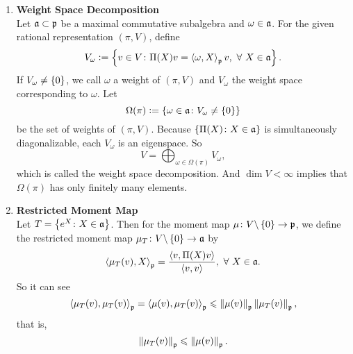 \documentclass[suri,pdfbookmark]{engsuribt} %
\begin{document}
  \begin{enumerate}[label = \arabic*.]
    \item \textbf{Weight Space Decomposition} \\
    Let $\mathfrak{a} \subset \mathfrak{p}$ be a maximal commutative subalgebra and $\omega \in \mathfrak{a}$. For the given rational representation $(\pi,V)$, define
    \begin{equation*}
      V_{\omega} \vcentcolon= \left\{v \in V \colon \Pi(X)v = \left\langle \omega,X \right\rangle_{\mathfrak{p}}v,~\forall~X \in \mathfrak{a}\right\}.
    \end{equation*}
    If $V_{\omega} \neq \left\{0\right\}$, we call $\omega$ a weight of $(\pi,V)$ and $V_{\omega}$ the weight space corresponding to $\omega$.
    Let
    \begin{equation*}
      \Omega(\pi) \vcentcolon= \left\{\omega \in \mathfrak{a} \colon V_{\omega} \neq \left\{0\right\}\right\}
    \end{equation*}
    be the set of weights of $(\pi,V)$. Because $\left\{\Pi(X) \colon X \in \mathfrak{a}\right\}$ is simultaneously diagonalizable, each $V_{\omega}$ is an eigenspace. So
    \begin{equation*}
      V = \bigoplus_{\omega \in \Omega(\pi)}V_{\omega},
    \end{equation*}
    which is called the weight space decomposition. And $\dim V < \infty$ implies that $\Omega(\pi)$ has only finitely many elements.

    \item \textbf{Restricted Moment Map} \\
    Let $T = \left\{e^X \colon X \in \mathfrak{a}\right\}$. Then for the moment map $\mu \colon V\backslash \left\{0\right\}  \rightarrow \mathfrak{p}$, we define the restricted moment map $\mu_T \colon  V\backslash \left\{0\right\}  \rightarrow \mathfrak{a}$ by
    \begin{equation*}
      \left\langle \mu_T(v),X \right\rangle_{\mathfrak{p}} = \frac{\left\langle v,\Pi(X)v \right\rangle}{\left\langle v,v \right\rangle},~\forall~X \in \mathfrak{a}.
    \end{equation*}
    So it can see
    \begin{equation*}
      \left\langle \mu_T(v),\mu_T(v) \right\rangle_{\mathfrak{p}} = \left\langle \mu(v),\mu_T(v) \right\rangle_{\mathfrak{p}} \leqslant \left\lVert\mu(v)\right\lVert_{\mathfrak{p}}\left\lVert\mu_T(v)\right\lVert_{\mathfrak{p}},
    \end{equation*}
    that is,
    \begin{equation}\label{in:4}
      \left\lVert\mu_T(v)\right\lVert_{\mathfrak{p}} \leqslant \left\lVert\mu(v)\right\lVert_{\mathfrak{p}}.
    \end{equation}


\end{enumerate}
\end{document}
